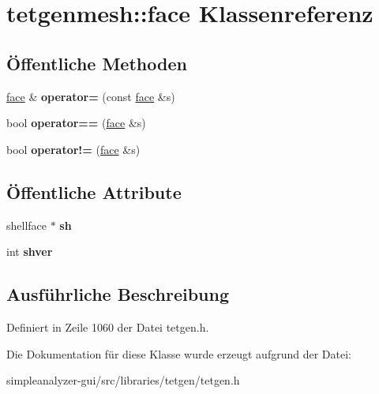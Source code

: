 \hypertarget{classtetgenmesh_1_1face}{\section{tetgenmesh\-:\-:face Klassenreferenz}
\label{classtetgenmesh_1_1face}
}
\subsection*{Öffentliche Methoden}
\begin{DoxyCompactItemize}
\item 
\hypertarget{classtetgenmesh_1_1face_a1321d78f189cee6bc26d71a985ee8dbe}{\hyperlink{classtetgenmesh_1_1face}{face} \& {\bfseries operator=} (const \hyperlink{classtetgenmesh_1_1face}{face} \&s)}\label{classtetgenmesh_1_1face_a1321d78f189cee6bc26d71a985ee8dbe}

\item 
\hypertarget{classtetgenmesh_1_1face_ae983f5faf62515e07c491e22f9249a6e}{bool {\bfseries operator==} (\hyperlink{classtetgenmesh_1_1face}{face} \&s)}\label{classtetgenmesh_1_1face_ae983f5faf62515e07c491e22f9249a6e}

\item 
\hypertarget{classtetgenmesh_1_1face_adbdb7e1a39ec0c3d92e7281b52e33ae3}{bool {\bfseries operator!=} (\hyperlink{classtetgenmesh_1_1face}{face} \&s)}\label{classtetgenmesh_1_1face_adbdb7e1a39ec0c3d92e7281b52e33ae3}

\end{DoxyCompactItemize}
\subsection*{Öffentliche Attribute}
\begin{DoxyCompactItemize}
\item 
\hypertarget{classtetgenmesh_1_1face_a0ebac53728a624fcb6528a7d2571b987}{shellface $\ast$ {\bfseries sh}}\label{classtetgenmesh_1_1face_a0ebac53728a624fcb6528a7d2571b987}

\item 
\hypertarget{classtetgenmesh_1_1face_a990a58ccf240d0d4197c2a923a1853d6}{int {\bfseries shver}}\label{classtetgenmesh_1_1face_a990a58ccf240d0d4197c2a923a1853d6}

\end{DoxyCompactItemize}


\subsection{Ausführliche Beschreibung}


Definiert in Zeile 1060 der Datei tetgen.\-h.



Die Dokumentation für diese Klasse wurde erzeugt aufgrund der Datei\-:\begin{DoxyCompactItemize}
\item 
simpleanalyzer-\/gui/src/libraries/tetgen/tetgen.\-h\end{DoxyCompactItemize}
